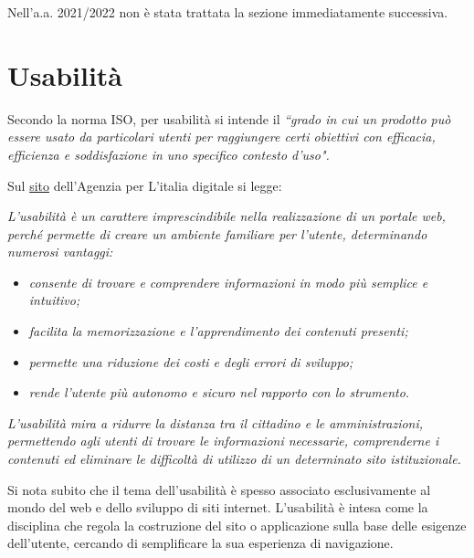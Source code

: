 Nell'a.a. 2021/2022 non è stata trattata la sezione immediatamente successiva.


\section{Usabilità}

Secondo la norma ISO, per usabilità si intende il \textit{``grado in cui un prodotto può essere usato da particolari utenti per raggiungere
certi obiettivi con efficacia, efficienza e soddisfazione in uno specifico contesto d’uso".} 

Sul \href{https://www.agid.gov.it/it/design-servizi/usabilita}{sito} dell'Agenzia per L'italia digitale si legge:

\vspace{\baselineskip}
\textit{L'usabilità è un carattere imprescindibile nella realizzazione di un portale web, perché permette di creare un ambiente familiare per
l'utente, determinando numerosi vantaggi:}
\begin{itemize}
	\itemsep-0.3em
    \item \textit{consente di trovare e comprendere informazioni in modo più semplice e intuitivo;}
    \item \textit{facilita la memorizzazione e l'apprendimento dei contenuti presenti;}
    \item \textit{permette una riduzione dei costi e degli errori di sviluppo;}
    \item \textit{rende l'utente più autonomo e sicuro nel rapporto con lo strumento.}
\end{itemize}

\textit{L'usabilità mira a ridurre la distanza tra il cittadino e le amministrazioni, permettendo agli utenti di trovare le informazioni necessarie,
comprenderne i contenuti ed eliminare le difficoltà di utilizzo di un determinato sito istituzionale.}
\vspace{\baselineskip}

Si nota subito che il tema dell'usabilità è spesso associato esclusivamente al mondo del web e dello sviluppo di siti internet. L'usabilità è
intesa come la disciplina che regola la costruzione del sito o applicazione sulla base delle esigenze dell’utente, cercando di semplificare la sua
esperienza di navigazione.

